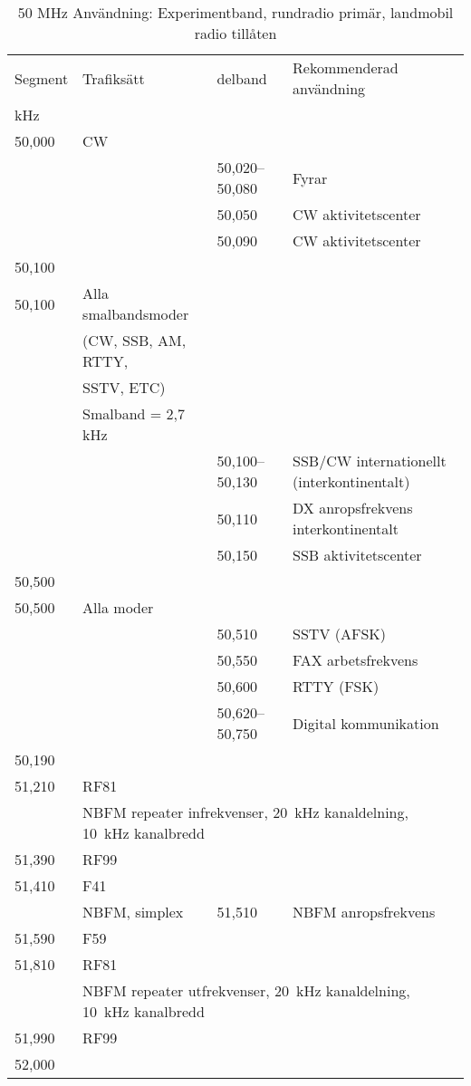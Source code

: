 \setlongtables
\begin{longtable}{llll}
\caption{50 MHz Användning: Experimentband, rundradio primär, landmobil radio tillåten} \\
Segment & Trafiksätt & delband & Rekommenderad användning \\
kHz     &            &         & \\ \hline
\endhead
50,000 & CW &                 & \\
       &    & 50,020--50,080 & Fyrar \\
       &    & 50,050          & CW aktivitetscenter \\
       &    & 50,090          & CW aktivitetscenter \\
50,100 &    &                 & \\ \hline

50,100 & Alla smalbandsmoder & & \\
       & (CW, SSB, AM, RTTY, & & \\
       & SSTV, ETC)          & & \\
       & Smalband = 2,7 kHz  & & \\
       &    & 50,100--50,130 & SSB/CW internationellt (interkontinentalt) \\
       &    & 50,110          & DX anropsfrekvens interkontinentalt \\
       &    & 50,150          & SSB aktivitetscenter \\
50,500 &    &                 & \\ \hline

50,500 & Alla moder & & \\
       &    & 50,510          & SSTV (AFSK) \\
       &    & 50,550          & FAX arbetsfrekvens \\
       &    & 50,600          & RTTY (FSK) \\
       &    & 50,620--50,750 & Digital kommunikation \\
50,190 &    &   & \\ \hline

51,210 & RF81 & & \\
       & \multicolumn{3}{l}{NBFM repeater infrekvenser, 20~kHz kanaldelning, 10~kHz kanalbredd} \\
51,390 & RF99 & & \\ \hline

51,410 & F41 & & \\
       & NBFM, simplex & 51,510 & NBFM anropsfrekvens\\
51,590 & F59 & & \\ \hline

51,810 & RF81 & & \\
       & \multicolumn{3}{l}{NBFM repeater utfrekvenser, 20~kHz kanaldelning, 10~kHz kanalbredd} \\
51,990 & RF99 & & \\
52,000 & & & \\
\end{longtable}

